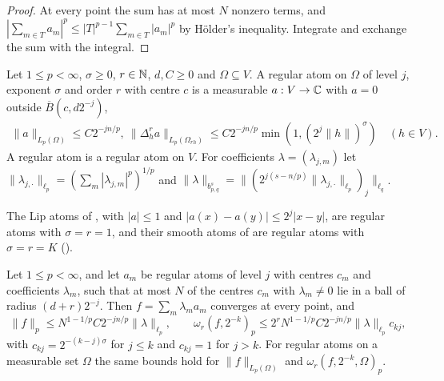 \begin{proof}
\leanok
At every point the sum has at most $N$ nonzero terms, and
$|\sum_{m \in T} a_m|^p \leq |T|^{p-1} \sum_{m \in T} |a_m|^p$ by H\"older's inequality. Integrate
and exchange the sum with the integral.
\end{proof}

\begin{definition}
\label{def:regular-atoms}
\leanok
{}
Let $1 \leq p < \infty$, $\sigma \geq 0$, $r \in \mathbb{N}$, $d, C \geq 0$ and $\Omega \subseteq V$. A
regular atom on $\Omega$ of level $j$, exponent $\sigma$ and order $r$ with centre $c$ is a
measurable $a : V \to \mathbb{C}$ with $a = 0$ outside $\overline{B}(c, d 2^{-j})$,
\begin{gather*}
  \|a\|_{L_p(\Omega)} \leq C 2^{-jn/p}, \
  \|\Delta_h^r a\|_{L_p(\Omega_{rh})} \leq C 2^{-jn/p} \min(1, (2^j \|h\|)^\sigma) \quad (h \in V).
\end{gather*}
A regular atom is a regular atom on $V$.
For coefficients $\lambda = (\lambda_{j,m})$ let
$\|\lambda_{j,\cdot}\|_{\ell_p} = (\sum_m |\lambda_{j,m}|^p)^{1/p}$ and
$\|\lambda\|_{b^s_{p,q}} = \|(2^{j(s - n/p)} \|\lambda_{j,\cdot}\|_{\ell_p})_j\|_{\ell_q}$.
\end{definition}

The Lip atoms of \cite[Definition 2.1]{SchneiderVybiral}, with $|a| \leq 1$ and
$|a(x) - a(y)| \leq 2^j |x - y|$, are regular atoms with $\sigma = r = 1$, and their smooth atoms of
\cite[Definition 1.3]{SchneiderVybiral} are regular atoms with $\sigma = r = K$
(\Cref{lem:pointwise-atoms}).

\begin{lemma}
\label{lem:level-sums}
\leanok
{}
Let $1 \leq p < \infty$, and let $a_m$ be regular atoms of level $j$ with centres $c_m$ and
coefficients $\lambda_m$, such that at most $N$ of the centres $c_m$ with $\lambda_m \neq 0$ lie in a
ball of radius $(d + r) 2^{-j}$. Then $f = \sum_m \lambda_m a_m$ converges at every point, and
\[
  \|f\|_p \leq N^{1-1/p} C 2^{-jn/p} \|\lambda\|_{\ell_p}, \qquad
  \omega_r(f, 2^{-k})_p \leq 2^r N^{1-1/p} C 2^{-jn/p} \|\lambda\|_{\ell_p} c_{kj},
\]
with $c_{kj} = 2^{-(k-j)\sigma}$ for $j \leq k$ and $c_{kj} = 1$ for $j > k$. For regular atoms
on a measurable set $\Omega$ the same bounds hold for $\|f\|_{L_p(\Omega)}$ and
$\omega_r(f, 2^{-k}, \Omega)_p$.
\end{lemma}

